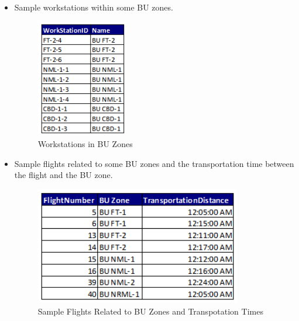 \documentclass[11pt,a4paper,fleqn]{article}
\begin{document}

\begin{itemize}

	\item Sample workstations within some BU zones.
	
	\begin{figure}[hbt!]
		\centering
		\includegraphics[width=40mm,scale=1.0]{sample_ws_bu.png}
		\caption{Workstations in BU Zones}
		\label{fig:Workstations in BU Zones}
	\end{figure}

\end{itemize}

\newpage

\begin{itemize}

	\item Sample flights related to some BU zones and the transportation time between the flight and the BU zone.
	
	\begin{figure}[hbt!]
		\centering
		\includegraphics[width=90mm,scale=1.5]{sample_bu_flight.png}
		\caption{Sample Flights Related to BU Zones and Transpotation Times}
		\label{fig:Sample Flights Related to BU Zones and Transpotation Times}
	\end{figure}

\end{itemize}
\end{document}
